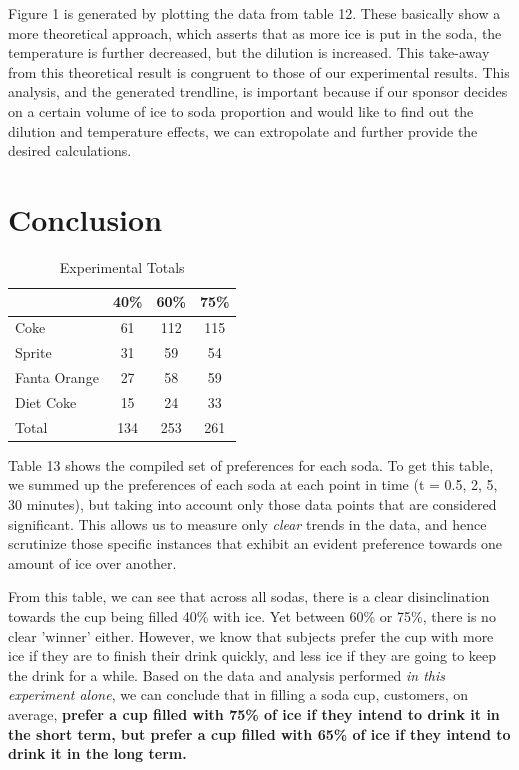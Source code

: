 \documentclass[oneside,12pt]{report}
\def\prefacesection#1{
\chapter*{#1}
\addcontentsline{toc}{chapter}{#1}
}
\begin{document}
Figure 1 is generated by plotting the data from table 12. These basically show a more theoretical approach, which asserts that as more ice is put in the soda, the temperature is further decreased, but the dilution is increased. This take-away from this theoretical result is congruent to those of our experimental results.  This analysis, and the generated trendline, is important because if our sponsor decides on a certain volume of ice to soda proportion and would like to find out the dilution and temperature effects, we can extropolate and further provide the desired calculations. 

%

\prefacesection{Conclusion}

\begin{table}[ h]
\centering
\begin{tabular}{ l || c|c|c }
  &40\% &60\% & 75\%  \\
\hline  
Coke & 61 & 112 & 115 \\
\hline  
Sprite & 31& 59 & 54 \\
\hline  
Fanta Orange & 27 & 58 & 59 \\ 
\hline  
Diet Coke & 15 & 24& 33 \\ 
\hline  
Total & 134 & 253 & 261  \\ 
\hline     
 \end{tabular}
\caption{Experimental Totals}
\end{table}


\vspace{24pt}
Table 13 shows the compiled set of preferences for each soda. To get this table,  we summed up the preferences of each soda at each point in time (t = 0.5, 2, 5, 30 minutes), but taking into account only those data points that are considered significant. This allows us to measure only \emph{clear} trends in the data, and hence scrutinize those specific instances that exhibit an evident preference towards one amount of ice over another. 

\vspace{12pt}
From this table, we can see that across all sodas, there is a clear disinclination towards the cup being filled 40\% with ice. Yet between 60\% or 75\%, there is no clear 'winner' either. However, we know that subjects prefer the cup with more ice if they are to finish their drink quickly, and less ice if they are going to keep the drink for a while. Based on the data and analysis performed \emph{in this experiment alone}, we can conclude that in filling a soda cup, customers, on average, \bf{ prefer a cup filled with 75\% of ice if they intend to drink it in the short term, but prefer a cup filled with 65\% of ice if they intend to drink it in the long term. }
\end{document}
